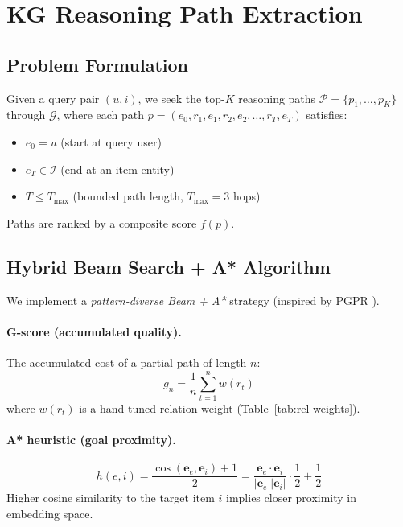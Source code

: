\documentclass[12pt,a4paper]{article}
\begin{document}
\section{KG Reasoning Path Extraction}
\label{sec:path}

\subsection{Problem Formulation}

Given a query pair $(u, i)$, we seek the top-$K$ reasoning paths
$\mathcal{P} = \{p_1, \ldots, p_K\}$ through $\mathcal{G}$, where each path
$p = (e_0, r_1, e_1, r_2, e_2, \ldots, r_T, e_T)$ satisfies:
\begin{itemize}[leftmargin=2em]
  \item $e_0 = u$ (start at query user)
  \item $e_T \in \mathcal{I}$ (end at an item entity)
  \item $T \leq T_{\max}$ (bounded path length, $T_{\max} = 3$ hops)
\end{itemize}
Paths are ranked by a composite score $f(p)$.

\subsection{Hybrid Beam Search + A* Algorithm}

We implement a \emph{pattern-diverse Beam + A*} strategy
(inspired by PGPR \cite{xian2019reinforcement}).

\paragraph{G-score (accumulated quality).}
The accumulated cost of a partial path of length $n$:
\begin{equation}
  g_n = \frac{1}{n} \sum_{t=1}^{n} w(r_t)
\end{equation}
where $w(r_t)$ is a hand-tuned relation weight (Table~\ref{tab:rel-weights}).

\paragraph{A* heuristic (goal proximity).}
\begin{equation}
  h(e, i) = \frac{\cos(\mathbf{e}_e, \mathbf{e}_i) + 1}{2}
           = \frac{\mathbf{e}_e \cdot \mathbf{e}_i}{|\mathbf{e}_e||\mathbf{e}_i|} \cdot \frac{1}{2} + \frac{1}{2}
\end{equation}
Higher cosine similarity to the target item $i$ implies closer proximity
in embedding space.
\end{document}
